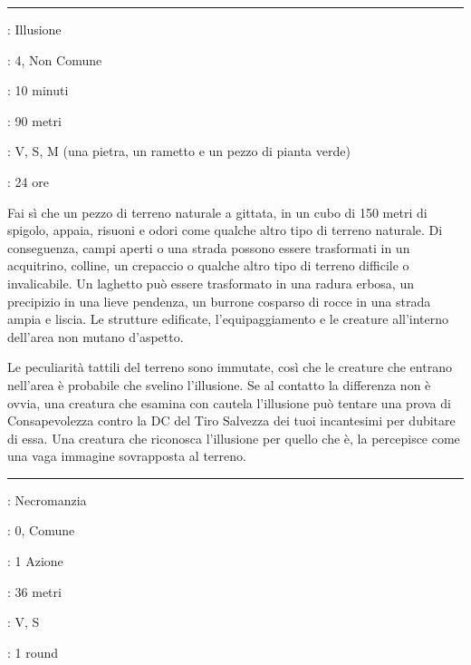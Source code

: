 \begin{multicols}{2}
\smallskip\noindent\rule{\linewidth}{2pt} \hypertarget{Terreno Illusorio}{}\medskip{}
\noindent
\begin{description}[noitemsep, topsep=0pt, parsep=0pt, partopsep=0pt, leftmargin=0cm, labelwidth=2.8cm]
	\item[\textbf{Lista di Magia}]: Illusione
	\item[\textbf{Livello}]: 4, Non Comune
	\item[\textbf{T. di Lancio}]: 10 minuti
	\item[\textbf{Gittata}]: 90 metri
	\item[\textbf{Componenti}]: V, S, M (una pietra, un rametto e un pezzo di pianta verde)
	\item[\textbf{Durata}]: 24 ore
\end{description}

Fai sì che un pezzo di terreno naturale a gittata, in un cubo di 150 metri di spigolo, appaia, risuoni e odori come qualche altro tipo di terreno naturale. Di conseguenza, campi aperti o una strada possono essere trasformati in un acquitrino, colline, un crepaccio o qualche altro tipo di terreno difficile o invalicabile. Un laghetto può essere trasformato in una radura erbosa, un precipizio in una lieve pendenza, un burrone cosparso di rocce in una strada ampia e liscia. Le strutture edificate, l'equipaggiamento e le creature all'interno dell'area non mutano d'aspetto.

Le peculiarità tattili del terreno sono immutate, così che le creature che entrano nell'area è probabile che svelino l'illusione. Se al contatto la differenza non è ovvia, una creatura che esamina con cautela l'illusione può tentare una prova di Consapevolezza contro la DC del Tiro Salvezza dei tuoi incantesimi per dubitare di essa. Una creatura che riconosca l'illusione per quello che è, la percepisce come una vaga immagine sovrapposta al terreno.

\smallskip\noindent\rule{\linewidth}{2pt} \hypertarget{Tocco Gelido}{}\medskip{}
\noindent
\begin{description}[noitemsep, topsep=0pt, parsep=0pt, partopsep=0pt, leftmargin=0cm, labelwidth=2.8cm]
	\item[\textbf{Lista di Magia}]: Necromanzia
	\item[\textbf{Livello}]: 0, Comune
	\item[\textbf{T. di Lancio}]: 1 Azione
	\item[\textbf{Gittata}]: 36 metri
	\item[\textbf{Componenti}]: V, S
	\item[\textbf{Durata}]: 1 round
\end{description}


\end{multicols}
